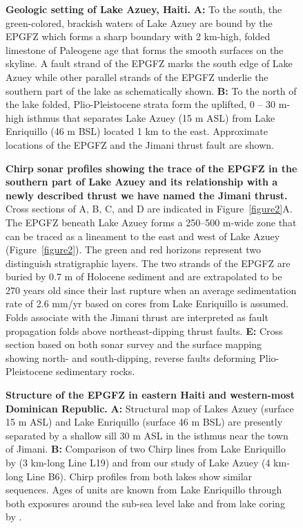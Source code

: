 \documentclass[linenumbers,draft]{agujournal}
\begin{document}
\begin{figure}
\centering
\caption{\textbf{Geologic setting of Lake Azuey, Haiti.} \textbf{A:} To the south, the green-colored, brackish waters of Lake Azuey are bound by the EPGFZ which forms a sharp boundary with 2 km-high, folded limestone of Paleogene age that forms the smooth surfaces on the skyline. A fault strand of the EPGFZ marks the south edge of Lake Azuey while other parallel strands of the EPGFZ underlie the southern part of the lake as schematically shown. \textbf{B:} To the north of the lake folded, Plio-Pleistocene strata form the uplifted, 0 -- 30 m-high isthmus that separates Lake Azuey (15 m ASL) from Lake Enriquillo (46 m BSL) located 1 km to the east. Approximate locations of the EPGFZ and the Jimani thrust fault are shown.}
\label{figure4}
\end{figure}

\begin{figure}
\centering
\caption{\textbf{Chirp sonar profiles showing the trace of the EPGFZ in the southern part of Lake Azuey and its relationship with a newly described thrust we have named the Jimani thrust.} Cross sections of A, B, C, and D are indicated in Figure~\ref{figure2}A. The EPGFZ beneath Lake Azuey forms a 250--500 m-wide zone that can be traced as a lineament to the east and west of Lake Azuey (Figure~\ref{figure2}). The green and red horizons represent two distinguish stratigraphic layers. The two strands of the EPGFZ are buried by 0.7 m of Holocene sediment and are extrapolated to be 270 years old since their last rupture when an average sedimentation rate of 2.6 mm/yr based on cores from Lake Enriquillo is assumed. Folds associate with the Jimani thrust are interpreted as fault propagation folds above northeast-dipping thrust faults. \textbf{E:} Cross section based on both sonar survey and the surface mapping \citep{mann1991overview} showing north- and south-dipping, reverse faults deforming Plio-Pleistocene sedimentary rocks.}
\label{figure5}
\end{figure}

\begin{figure}
\centering
\caption{\textbf{Structure of the EPGFZ in eastern Haiti and western-most Dominican Republic.} \textbf{A:} Structural map of Lakes Azuey (surface 15 m ASL) and Lake Enriquillo (surface 46 m BSL) are presently separated by a shallow sill 30 m ASL in the isthmus near the town of Jimani. \textbf{B:} Comparison of two Chirp lines from Lake Enriquillo by \citet{rios2013holocene} (3 km-long Line L19) and from our study of Lake Azuey (4 km-long Line B6). Chirp profiles from both lakes show similar sequences. Ages of units are known from Lake Enriquillo through both exposures around the sub-sea level lake and from lake coring by \citet{rios2013holocene}.}
\label{figure6}
\end{figure}
\end{document}

